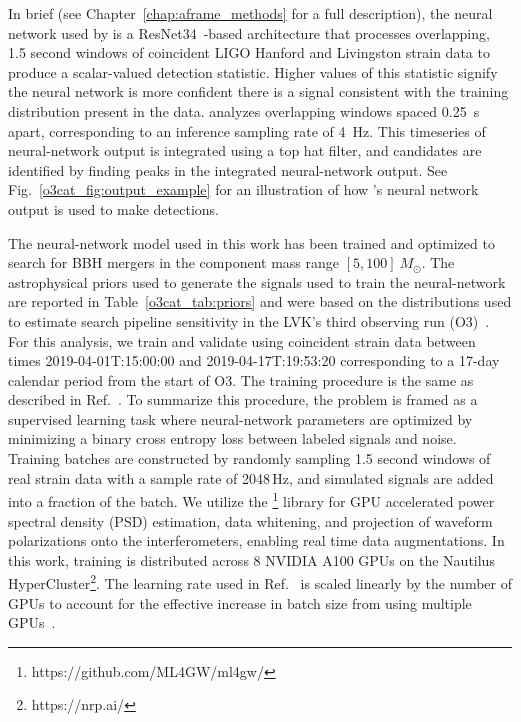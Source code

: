 \begin{refsection}
In brief (see Chapter~\ref{chap:aframe_methods} for a full description), the neural network used by \aframe is a ResNet34~\cite{resnet}-based architecture that processes overlapping, 1.5 second windows of coincident LIGO Hanford and Livingston strain data to produce a scalar-valued detection statistic. 
Higher values of this statistic signify the neural network is more confident there is a signal consistent with the training distribution present in the data. 
\aframe analyzes overlapping windows spaced 0.25~s apart, corresponding to an inference sampling rate of 4~Hz. 
This timeseries of neural-network output is integrated using a top hat filter, and candidates are identified by finding peaks in the integrated neural-network output. 
See Fig.~\ref{o3cat_fig:output_example} for an illustration of how \aframe's neural network output is used to make detections. 

The neural-network model used in this work has been trained and optimized to search for BBH mergers in the component mass range $[5, 100]~ M_\odot$. 
The astrophysical priors used to generate the signals used to train the neural-network are reported in Table~\ref{o3cat_tab:priors} and were based on the distributions used to estimate search pipeline sensitivity in the LVK's third observing run (O3)~\cite{ligo_scientific_collaboration_and_virgo_2023_7890437}. 
For this analysis, we train and validate \aframe using coincident strain data between times 2019-04-01T:15:00:00 and 2019-04-17T:19:53:20 corresponding to a 17-day calendar period from the start of O3. 
The training procedure is the same as described in Ref.~\cite{aframe-methods}. 
To summarize this procedure, the problem is framed as a supervised learning task where neural-network parameters are optimized by minimizing a binary cross entropy loss between labeled signals and noise. 
Training batches are constructed by randomly sampling 1.5 second windows of real strain data with a sample rate of 2048\,Hz, and simulated signals are added into a fraction of the batch. 
We utilize the \mlgw\footnote{https://github.com/ML4GW/ml4gw/} library for GPU accelerated power spectral density (PSD) estimation, data whitening, and projection of waveform polarizations onto the interferometers, enabling real time data augmentations. 
In this work, training is distributed across 8 NVIDIA A100 GPUs on the Nautilus HyperCluster\footnote{https://nrp.ai/}. 
The learning rate used in Ref.~\cite{aframe-methods} is scaled linearly by the number of GPUs to account for the effective increase in batch size from using multiple GPUs~\cite{lr_scaling}.


\end{refsection}
